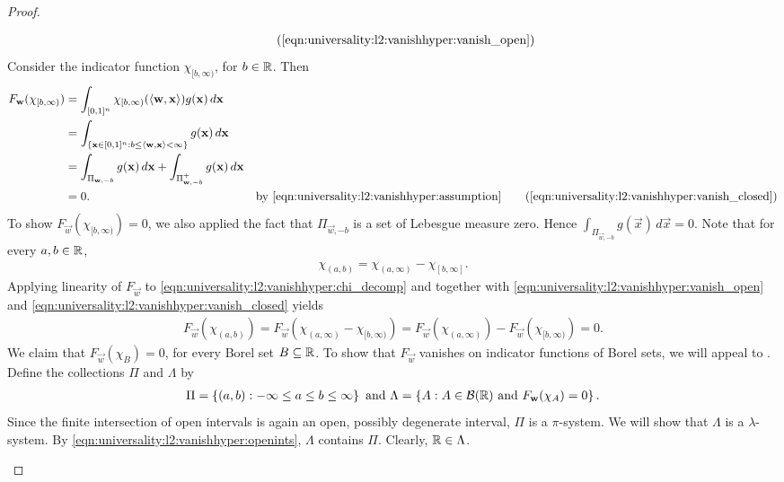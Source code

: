 \begin{proof}
\begin{step}
\begin{subequations}
\begin{align*}
    \tag{\ref{eqn:universality:l2:vanishhyper:vanish_open}} 
\end{align*}
\end{subequations}
Consider the indicator function $\chi_{[b, \infty)}$, for $b \in {\mathbb R}$. Then
\begin{subequations}\label{eqn:universality:l2:vanishhyper:vanish_closed}
\begin{align*}
    F_{\vec{w}}(\chi_{[b, \infty)}) &=  \int_{[0,1]^n} \chi_{[b, \infty)}( \langle \vec{w}, \vec{x} \rangle) g(\vec{x}) \, d \vec{x} \\
    &=   \int_{\{ \vec{x} \in [0,1]^n : b \leq \langle \vec{w}, \vec{x}  \rangle < \infty  \}} g(\vec{x}) \, d \vec{x} \\
    &=  \int_{ \Pi_{\vec{w}, -b} } g(\vec{x}) \, d \vec{x} + \int_{ \Pi_{\vec{w}, -b}^{+} } g(\vec{x}) \, d \vec{x} \\
    &= 0. & \text{by \ref{eqn:universality:l2:vanishhyper:assumption}}
    \tag{\ref{eqn:universality:l2:vanishhyper:vanish_closed}} 
\end{align*}
\end{subequations}
To show $F_{\vec{w}}(\chi_{[b, \infty)}) = 0$, we also applied the fact that $\Pi_{\vec{w}, -b}$ is a set of Lebesgue measure zero. Hence $\int_{ \Pi_{\vec{w}, -b} } g(\vec{x}) \, d \vec{x} = 0$. Note that for every $a, b \in {\mathbb R}$,
\begin{align}
     \label{eqn:universality:l2:vanishhyper:chi_decomp}
     \chi_{(a,b)} = \chi_{(a, \infty)} - \chi_{[b, \infty]}. 
\end{align}
Applying linearity of $F_\vec{w}$ to \ref{eqn:universality:l2:vanishhyper:chi_decomp} and together with \ref{eqn:universality:l2:vanishhyper:vanish_open} and \ref{eqn:universality:l2:vanishhyper:vanish_closed} yields
\begin{align}
    \label{eqn:universality:l2:vanishhyper:openints}
    F_{\vec{w}}(\chi_{(a,b)}) = F_{\vec{w}}(\chi_{(a, \infty)} - \chi_{[b, \infty)}) = F_{\vec{w}}(\chi_{(a, \infty)}) - F_{\vec{w}}(\chi_{[b, \infty)}) = 0.
\end{align} We claim that $F_{\vec{w}}(\chi_B) = 0$, for every Borel set $B \subseteq {\mathbb R}$.
To show that $F_\vec{w}$ vanishes on indicator functions of Borel sets, we will appeal to .
Define the collections $\Pi$ and $\Lambda$ by 
\begin{align*}
    \Pi = \left \{ (a,b) : -\infty \leq a \leq b \leq \infty \right \} \text{ and }
    \Lambda = \left \{ A : A \in {\mathcal B}({\mathbb R}) \text{ and } F_{\mathbf{w}}(\chi_{A}) = 0 \right \}.
\end{align*}
Since the finite intersection of open intervals is again an open, possibly degenerate interval, $\Pi$ is a $\pi$-system. We will show that $\Lambda$ is a $\lambda$-system. By \ref{eqn:universality:l2:vanishhyper:openints}, $\Lambda$ contains $\Pi$. Clearly, ${\mathbb R} \in \Lambda$. 


\end{step}
\end{proof}
